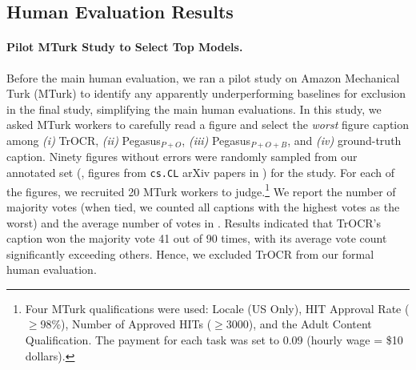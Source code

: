 \subsection{Human Evaluation Results\label{sec:human-eval}}


\paragraph{Pilot MTurk Study to Select Top Models.}
Before the main human evaluation, we ran a pilot study on Amazon Mechanical Turk (MTurk) to identify any apparently underperforming baselines for exclusion in the final study, simplifying the main human evaluations.
In this study, we asked MTurk workers to carefully read a figure and select the \textit{worst} figure caption among 
{\em (i)} TrOCR, 
{\em (ii)} Pegasus$_{P+O}$, 
{\em (iii)} Pegasus$_{P+O+B}$, and 
{\em (iv)} ground-truth caption. 
Ninety figures without errors were randomly sampled from our annotated set (\ie, figures from \texttt{cs.CL} arXiv papers in ) for the study.
For each of the figures, we recruited 20 MTurk workers to judge.\footnote{Four MTurk qualifications were used: Locale (US Only), HIT Approval Rate ($\geq$98\%), Number of Approved HITs ($\geq$3000), and the Adult Content Qualification. The payment for each task was set to 0.09 (hourly wage = \$10 dollars).}
We report the number of majority votes (when tied, we counted all captions with the highest votes as the worst) and the average number of votes in .
Results indicated that TrOCR's caption won the majority vote 41 out of 90 times, with its average vote count significantly exceeding others.
Hence, we excluded TrOCR from our formal human evaluation.


